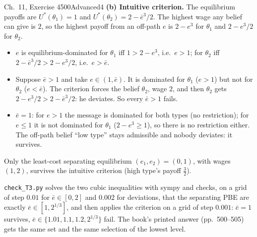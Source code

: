 \begin{exsol}{\MG{} Ch.~11, Exercise 4}{500}{Advanced}{4}
\textbf{(b) Intuitive criterion.} The equilibrium payoffs are $U^*(\theta_1) = 1$ and
$U^*(\theta_2) = 2 - \bar e^3/2$. The highest wage any belief can give is $2$, so the highest payoff from an
off-path $e$ is $2 - e^3$ for $\theta_1$ and $2 - e^3/2$ for $\theta_2$.
\begin{itemize}
  \item $e$ is equilibrium-dominated for $\theta_1$ iff $1 > 2 - e^3$, i.e.\ $e > 1$; for $\theta_2$ iff
  $2 - \bar e^3/2 > 2 - e^3/2$, i.e.\ $e > \bar e$.
  \item Suppose $\bar e > 1$ and take $e \in (1, \bar e)$. It is dominated for $\theta_1$ ($e > 1$) but not for
  $\theta_2$ ($e < \bar e$). The criterion forces the belief $\theta_2$, wage $2$, and then $\theta_2$ gets
  $2 - e^3/2 > 2 - \bar e^3/2$: he deviates. So every $\bar e > 1$ fails.
  \item $\bar e = 1$: for $e > 1$ the message is dominated for both types (no restriction); for $e \le 1$ it
  is not dominated for $\theta_1$ ($2 - e^3 \ge 1$), so there is no restriction either. The off-path
  belief ``low type'' stays admissible and nobody deviates: it survives.
\end{itemize}
Only the least-cost separating equilibrium $(e_1, e_2) = (0, 1)$, with wages $(1, 2)$, survives the intuitive
criterion (high type's payoff $\frac32$).

\verify \texttt{check\_T3.py} solves the two cubic inequalities with sympy and checks, on a grid of step
$0.01$ for $\bar e \in [0, 2]$ and $0.002$ for deviations, that the separating PBE are exactly
$\bar e \in [1, 2^{1/3}]$, and then applies the criterion on a grid of step $0.001$: $\bar e = 1$ survives,
$\bar e \in \{1.01, 1.1, 1.2, 2^{1/3}\}$ fail. The book's printed answer (pp.~500--505) gets the same
set and the same selection of the lowest level.

\end{exsol}
